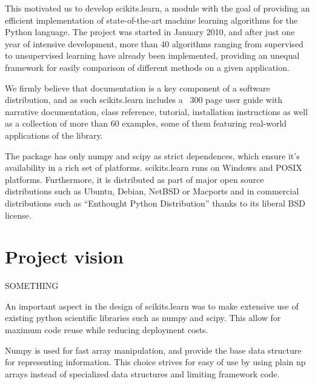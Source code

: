 \documentclass[twoside,11pt]{article}
\begin{document}


This motivated us to develop scikits.learn, a module with the goal of
providing an efficient implementation of state-of-the-art machine
learning algorithms for the Python language. The project was started
in January 2010, and after just one year of intensive development,
more than 40 algorithms ranging from supervised to unsupervised
learning have already been implemented, providing an unequal framework
for easily comparison of different methods on a given application.


We firmly believe that documentation is a key component of a software
distribution, and as such scikits.learn includes a ~300 page user
guide with narrative documentation, class reference, tutorial,
installation instructions as well as a collection of more than 60
examples, some of them featuring real-world applications of the
library.


The package has only numpy and scipy as strict dependences, which
ensure it's availability in a rich set of platforms. scikits.learn
runs on Windows and POSIX platforms. Furthermore, it is distributed as
part of major open source distributions such as Ubuntu, Debian, NetBSD
or Macports and in commercial distributions such as ``Enthought Python
Distribution'' thanks to its liberal BSD license.


\section{Project vision}

SOMETHING

An important aspect in the design of scikits.learn was to make
extensive use of existing python scientific libraries such as numpy
and scipy. This allow for maximum code reuse while reducing deployment
costs.

Numpy is used for fast array manipulation, and provide the base data
structure for representing information. This choice strives for easy
of use by using plain np arrays instead of specialized data structures
and limiting framework code.
\end{document}
